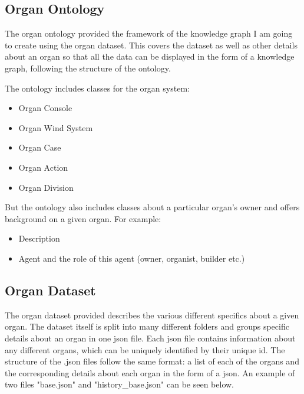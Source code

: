 \subsection{Organ Ontology}
\hspace{0.5cm} The organ ontology provided the framework of the knowledge graph I am going to create using the organ dataset. This covers the dataset as well as other details about an organ so that all the data can be displayed in the form of a knowledge graph, following the structure of the ontology. 

The ontology includes classes for the organ system:
\begin{itemize}
\item Organ Console
\item Organ Wind System
\item Organ Case
\item Organ Action
\item Organ Division
\end{itemize}

But the ontology also includes classes about a particular organ's owner and offers background on a given organ. For example:
\begin{itemize}
\item Description
\item Agent and the role of this agent (owner, organist, builder etc.)
\end{itemize}

\subsection{Organ Dataset}
\hspace{0.5cm} The organ dataset provided describes the various different specifics about a given organ. The dataset itself is split into many different folders and groups specific details about an organ in one json file. Each json file contains information about any different organs, which can be uniquely identified by their unique id. The structure of the .json files follow the same format: a list of each of the organs and the corresponding details about each organ in the form of a json. An example of two files "base.json" and "history\_base.json" can be seen below. 

